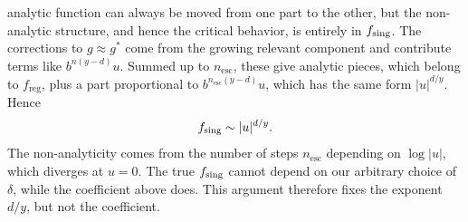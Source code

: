 analytic function can always be moved from one part to the other, but the
non-analytic structure, and hence the critical behavior, is entirely in
$f_{\text{sing}}$.
The corrections to $g\approx g^*$ come from the growing relevant component and
contribute terms like $b^{n(y-d)}u$. Summed up to $n_\text{esc}$, these give
analytic pieces, which belong to $f_\text{reg}$, plus a part proportional to
$b^{n_\text{esc}(y-d)}u$, which has the same form $|u|^{d/y}$. Hence
\begin{equation}
  f_{\text{sing}}\sim|u|^{d/y}.
\end{equation}
The non-analyticity comes from the number of steps $n_\text{esc}$ depending on
$\log|u|$, which diverges at $u=0$. The true $f_{\text{sing}}$ cannot depend on our
arbitrary choice of $\delta$, while the coefficient above does. This argument
therefore fixes the exponent $d/y$, but not the coefficient.

